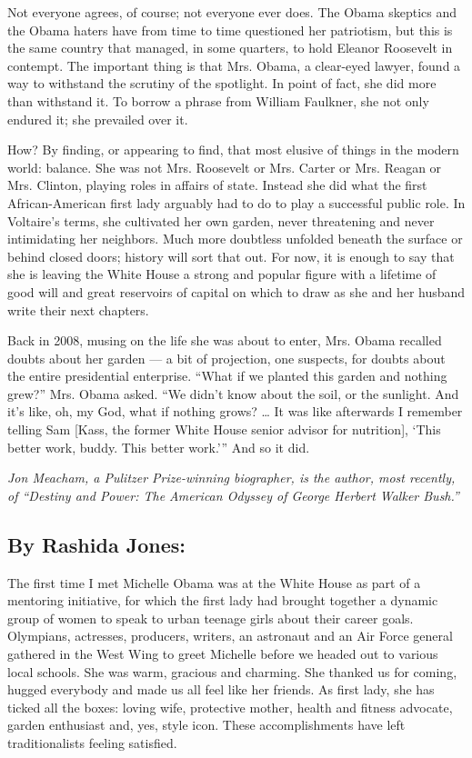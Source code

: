 Not everyone agrees, of course; not everyone ever does. The Obama
skeptics and the Obama haters have from time to time questioned her
patriotism, but this is the same country that managed, in some quarters,
to hold Eleanor Roosevelt in contempt. The important thing is that Mrs.
Obama, a clear-eyed lawyer, found a way to withstand the scrutiny of the
spotlight. In point of fact, she did more than withstand it. To borrow a
phrase from William Faulkner, she not only endured it; she prevailed
over it.

How? By finding, or appearing to find, that most elusive of things in
the modern world: balance. She was not Mrs. Roosevelt or Mrs. Carter or
Mrs. Reagan or Mrs. Clinton, playing roles in affairs of state. Instead
she did what the first African-American first lady arguably had to do to
play a successful public role. In Voltaire's terms, she cultivated her
own garden, never threatening and never intimidating her neighbors. Much
more doubtless unfolded beneath the surface or behind closed doors;
history will sort that out. For now, it is enough to say that she is
leaving the White House a strong and popular figure with a lifetime of
good will and great reservoirs of capital on which to draw as she and
her husband write their next chapters.

Back in 2008, musing on the life she was about to enter, Mrs. Obama
recalled doubts about her garden --- a bit of projection, one suspects,
for doubts about the entire presidential enterprise. ``What if we
planted this garden and nothing grew?'' Mrs. Obama asked. ``We didn't
know about the soil, or the sunlight. And it's like, oh, my God, what if
nothing grows? \ldots{} It was like afterwards I remember telling Sam
{[}Kass, the former White House senior advisor for nutrition{]}, `This
better work, buddy. This better work.''' And so it did.

\emph{Jon Meacham, a Pulitzer Prize-winning biographer, is the author,
most recently, of ``Destiny and Power: The American Odyssey of George
Herbert Walker Bush.''}

\hypertarget{by-rashida-jones}{%
\subsection{By Rashida Jones:}\label{by-rashida-jones}}

The first time I met Michelle Obama was at the White House as part of a
mentoring initiative, for which the first lady had brought together a
dynamic group of women to speak to urban teenage girls about their
career goals. Olympians, actresses, producers, writers, an astronaut and
an Air Force general gathered in the West Wing to greet Michelle before
we headed out to various local schools. She was warm, gracious and
charming. She thanked us for coming, hugged everybody and made us all
feel like her friends. As first lady, she has ticked all the boxes:
loving wife, protective mother, health and fitness advocate, garden
enthusiast and, yes, style icon. These accomplishments have left
traditionalists feeling satisfied.

